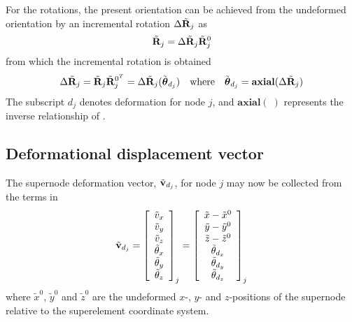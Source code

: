 {For the rotations, the present orientation can be achieved from the undeformed
orientation by an incremental rotation $\Delta\tilde{\bf R}_j$ as
%
\begin{equation}
\tilde{\bf R}_j = \Delta\tilde{\bf R}_j\tilde{\bf R}_j^0
\end{equation}
%
from which the incremental rotation is obtained
%
\begin{equation}
\Delta\tilde{\mf R}_j = \tilde{\mf R}_j \tilde{\mf R}_j^{0^T}
%
%
= \Delta\tilde{\mf R}_j(\tilde{\tf \theta}_{d_j})
\quad\text{where}\quad
\tilde{\tf \theta}_{d_j} = \textbf{axial}(\Delta\tilde{\mf R}_j)
\label{eq:defRotation}
\end{equation}
%
The subscript $d_j$ denotes deformation for node $j$, and $\textbf{axial}(\;)$
represents the inverse relationship of .

\subsection{Deformational displacement vector}

The supernode deformation vector, $\tilde{\bf v}_{d_j}$, for node $j$ may now be
collected from the terms in 
%
\begin{equation}
\tilde{\bf v}_{d_j} = \left[\begin{array}{c}
\tilde{v}_x \\
\tilde{v}_y \\
\tilde{v}_z \\
\tilde{\theta}_x \\
\tilde{\theta}_y \\
\tilde{\theta}_z
\end{array}\right]_j =
\left[\begin{array}{c}
\tilde{x} - \tilde{x}^0 \\
\tilde{y} - \tilde{y}^0 \\
\tilde{z} - \tilde{z}^0 \\
\tilde{\theta}_{d_x} \\
\tilde{\theta}_{d_y} \\
\tilde{\theta}_{d_z}
\end{array}\right]_j
\label{eqSC:nodeDefDisp}
\end{equation}
%
where $\tilde{x}^0$, $\tilde{y}^0$ and $\tilde{z}^0$ are the undeformed $x$-,
$y$- and $z$-positions of the supernode relative to the superelement coordinate
system.

}
